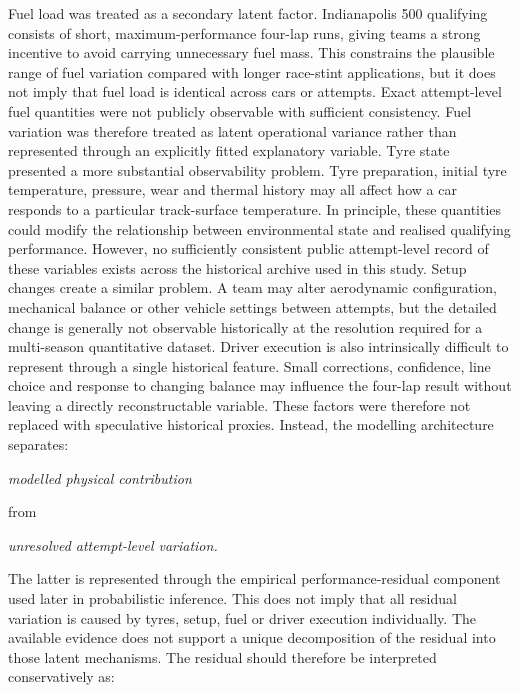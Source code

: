 Fuel load was treated as a secondary latent factor. Indianapolis 500 qualifying consists of short, maximum-performance four-lap runs, giving teams a strong incentive to avoid carrying unnecessary fuel mass. This constrains the plausible range of fuel variation compared with longer race-stint applications, but it does not imply that fuel load is identical across cars or attempts. Exact attempt-level fuel quantities were not publicly observable with sufficient consistency. Fuel variation was therefore treated as latent operational variance rather than represented through an explicitly fitted explanatory variable. Tyre state presented a more substantial observability problem. Tyre preparation, initial tyre temperature, pressure, wear and thermal history may all affect how a car responds to a particular track-surface temperature. In principle, these quantities could modify the relationship between environmental state and realised qualifying performance. However, no sufficiently consistent public attempt-level record of these variables exists across the historical archive used in this study. Setup changes create a similar problem. A team may alter aerodynamic configuration, mechanical balance or other vehicle settings between attempts, but the detailed change is generally not observable historically at the resolution required for a multi-season quantitative dataset. Driver execution is also intrinsically difficult to represent through a single historical feature. Small corrections, confidence, line choice and response to changing balance may influence the four-lap result without leaving a directly reconstructable variable. These factors were therefore not replaced with speculative historical proxies. Instead, the modelling architecture separates:

\begin{center}\textit{modelled physical contribution}\end{center}

from

\begin{center}\textit{unresolved attempt-level variation.}\end{center}

The latter is represented through the empirical performance-residual component used later in probabilistic inference. This does not imply that all residual variation is caused by tyres, setup, fuel or driver execution individually. The available evidence does not support a unique decomposition of the residual into those latent mechanisms. The residual should therefore be interpreted conservatively as:

